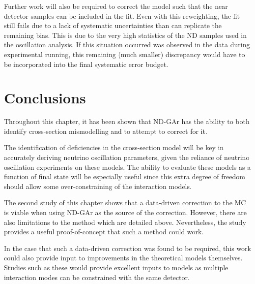 Further work will also be required to correct the model such that the near detector samples can be included in the fit.
Even with this reweighting, the fit still fails due to a lack of systematic uncertainties than can replicate the remaining bias.
This is due to the very high statistics of the ND samples used in the oscillation analysis.
If this situation occurred was observed in the data during experimental running, this remaining (much smaller) discrepancy would have to be incorporated into the final systematic error budget.

\section{Conclusions}
\label{sec:dune_ndrwt:conclusions}

Throughout this chapter, it has been shown that ND-GAr has the ability to both identify cross-section mismodelling and to attempt to correct for it.

The identification of deficiencies in the cross-section model will be key in accurately deriving neutrino oscillation parameters, given the reliance of neutrino oscillation experiments on these models.
The ability to evaluate these models as a function of final state will be especially useful since this extra degree of freedom should allow some over-constraining of the interaction models.

The second study of this chapter shows that a data-driven correction to the MC is viable when using ND-GAr as the source of the correction.
However, there are also limitations to the method which are detailed above. 
Nevertheless, the study provides a useful proof-of-concept that such a method could work.

In the case that such a data-driven correction was found to be required, this work could also provide input to improvements in the theoretical models themselves.
Studies such as these would provide excellent inputs to models as multiple interaction modes can be constrained with the same detector.